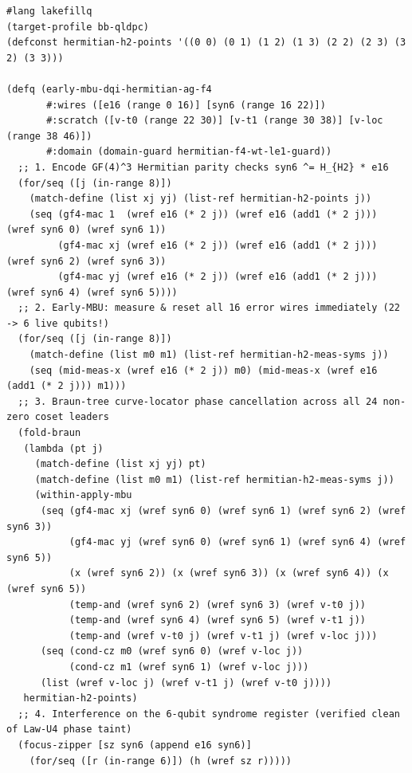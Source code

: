 \documentclass[acmsmall,screen,anonymous]{acmart}
\DeclareRobustCommand{\_}{\ifmmode\text{\char95}\else\char95\penalty0\relax\fi}
\theoremstyle{plain}
\begin{document}
\begin{lstlisting}[language=LakefillLisp,caption={Early-MBU DQI on the {$[8,5,3]_{\mathbb{F}_4}$} Hermitian curve $H_2: x^3 = y^2 + y$ (\texttt{examples/early\_mbu\_dqi\_hermitian\_ag\_f4.lfq}), shrinking live width from 22 to 6 qubits via \texttt{mid-meas-x} and \texttt{fold-braun}.},label={alg:ag_dqi}]
#lang lakefillq
(target-profile bb-qldpc)
(defconst hermitian-h2-points '((0 0) (0 1) (1 2) (1 3) (2 2) (2 3) (3 2) (3 3)))

(defq (early-mbu-dqi-hermitian-ag-f4
       #:wires ([e16 (range 0 16)] [syn6 (range 16 22)])
       #:scratch ([v-t0 (range 22 30)] [v-t1 (range 30 38)] [v-loc (range 38 46)])
       #:domain (domain-guard hermitian-f4-wt-le1-guard))
  ;; 1. Encode GF(4)^3 Hermitian parity checks syn6 ^= H_{H2} * e16
  (for/seq ([j (in-range 8)])
    (match-define (list xj yj) (list-ref hermitian-h2-points j))
    (seq (gf4-mac 1  (wref e16 (* 2 j)) (wref e16 (add1 (* 2 j))) (wref syn6 0) (wref syn6 1))
         (gf4-mac xj (wref e16 (* 2 j)) (wref e16 (add1 (* 2 j))) (wref syn6 2) (wref syn6 3))
         (gf4-mac yj (wref e16 (* 2 j)) (wref e16 (add1 (* 2 j))) (wref syn6 4) (wref syn6 5))))
  ;; 2. Early-MBU: measure & reset all 16 error wires immediately (22 -> 6 live qubits!)
  (for/seq ([j (in-range 8)])
    (match-define (list m0 m1) (list-ref hermitian-h2-meas-syms j))
    (seq (mid-meas-x (wref e16 (* 2 j)) m0) (mid-meas-x (wref e16 (add1 (* 2 j))) m1)))
  ;; 3. Braun-tree curve-locator phase cancellation across all 24 non-zero coset leaders
  (fold-braun
   (lambda (pt j)
     (match-define (list xj yj) pt)
     (match-define (list m0 m1) (list-ref hermitian-h2-meas-syms j))
     (within-apply-mbu
      (seq (gf4-mac xj (wref syn6 0) (wref syn6 1) (wref syn6 2) (wref syn6 3))
           (gf4-mac yj (wref syn6 0) (wref syn6 1) (wref syn6 4) (wref syn6 5))
           (x (wref syn6 2)) (x (wref syn6 3)) (x (wref syn6 4)) (x (wref syn6 5))
           (temp-and (wref syn6 2) (wref syn6 3) (wref v-t0 j))
           (temp-and (wref syn6 4) (wref syn6 5) (wref v-t1 j))
           (temp-and (wref v-t0 j) (wref v-t1 j) (wref v-loc j)))
      (seq (cond-cz m0 (wref syn6 0) (wref v-loc j))
           (cond-cz m1 (wref syn6 1) (wref v-loc j)))
      (list (wref v-loc j) (wref v-t1 j) (wref v-t0 j))))
   hermitian-h2-points)
  ;; 4. Interference on the 6-qubit syndrome register (verified clean of Law-U4 phase taint)
  (focus-zipper [sz syn6 (append e16 syn6)]
    (for/seq ([r (in-range 6)]) (h (wref sz r)))))
\end{lstlisting}
\end{document}
